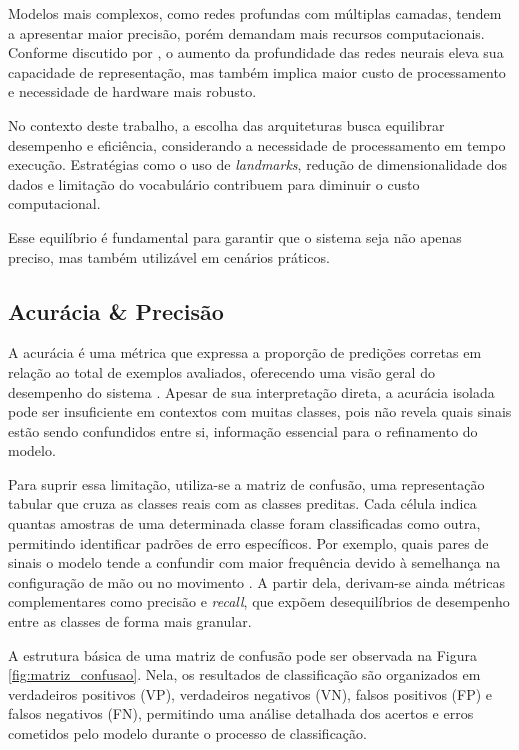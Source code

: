 \documentclass[
    12pt,                %
    openright,           %
    oneside,             %
    a4paper,             %
    english,             %
    brazil               %
]{abntex2}
\begin{document}
Modelos mais complexos, como redes profundas com múltiplas camadas, tendem a apresentar maior precisão, porém demandam mais recursos computacionais. Conforme discutido por , o aumento da profundidade das redes neurais eleva sua capacidade de representação, mas também implica maior custo de processamento e necessidade de hardware mais robusto.

No contexto deste trabalho, a escolha das arquiteturas busca equilibrar desempenho e eficiência, considerando a necessidade de processamento em tempo execução. Estratégias como o uso de \textit{landmarks}, redução de dimensionalidade dos dados e limitação do vocabulário contribuem para diminuir o custo computacional.

Esse equilíbrio é fundamental para garantir que o sistema seja não apenas preciso, mas também utilizável em cenários práticos.

\subsection{Acurácia \& Precisão}

A acurácia é uma métrica que expressa a proporção de predições corretas em relação ao total de exemplos avaliados, oferecendo uma visão geral do desempenho do sistema \cite{Goodfellow2016}. Apesar de sua interpretação direta, a acurácia isolada pode ser insuficiente em contextos com muitas classes, pois não revela quais sinais estão sendo confundidos entre si, informação essencial para o refinamento do modelo.

Para suprir essa limitação, utiliza-se a matriz de confusão, uma representação tabular que cruza as classes reais com as classes preditas. Cada célula indica quantas amostras de uma determinada classe foram classificadas como outra, permitindo identificar padrões de erro específicos. Por exemplo, quais pares de sinais o modelo tende a confundir com maior frequência devido à semelhança na configuração de mão ou no movimento \cite{Goodfellow2016}. A partir dela, derivam-se ainda métricas complementares como precisão e \textit{recall}, que expõem desequilíbrios de desempenho entre as classes de forma mais granular.

A estrutura básica de uma matriz de confusão pode ser observada na Figura \ref{fig:matriz_confusao}. Nela, os resultados de classificação são organizados em verdadeiros positivos (VP), verdadeiros negativos (VN), falsos positivos (FP) e falsos negativos (FN), permitindo uma análise detalhada dos acertos e erros cometidos pelo modelo durante o processo de classificação.
\end{document}

